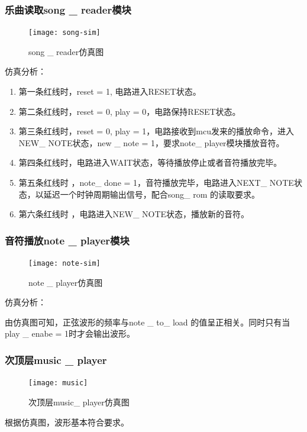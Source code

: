 \documentclass{../source/Experiment}
\begin{document}
            \subsubsection{乐曲读取song \_ reader模块}
                \begin{figure}[H]
                    \centering
                    \texttt{[image: song-sim]}
                    \caption{song \_ reader仿真图}
                \end{figure}

            仿真分析：

            \begin{enumerate}
                \item 第一条红线时，reset = 1, 电路进入RESET状态。
                \item 第二条红线时，reset = 0, play = 0，电路保持RESET状态。
                \item 第三条红线时，reset = 0, play = 1，电路接收到mcu发来的播放命令，进入NEW\_ NOTE状态，new \_ note = 1，要求note\_ player模块播放音符。 
                \item 第四条红线时，电路进入WAIT状态，等待播放停止或者音符播放完毕。
                \item 第五条红线时 ，note\_ done = 1，音符播放完毕，电路进入NEXT\_ NOTE状态，以延迟一个时钟周期输出信号，配合song\_ rom 的读取要求。
                \item 第六条红线时 ，电路进入NEW\_ NOTE状态，播放新的音符。
            \end{enumerate}
            \subsubsection{音符播放note \_ player模块}
                \begin{figure}[H]
                    \centering
                    \texttt{[image: note-sim]}
                    \caption{note \_ player仿真图}
                \end{figure}

            仿真分析：
            
            由仿真图可知，正弦波形的频率与note \_ to\_ load 的值呈正相关。同时只有当play \_ enabe = 1时才会输出波形。

            \subsubsection{次顶层music \_ player}
                \begin{figure}[H]
                    \centering
                    \texttt{[image: music]}
                    \caption{次顶层music\_ player仿真图}
                \end{figure}
            根据仿真图，波形基本符合要求。
\end{document}

